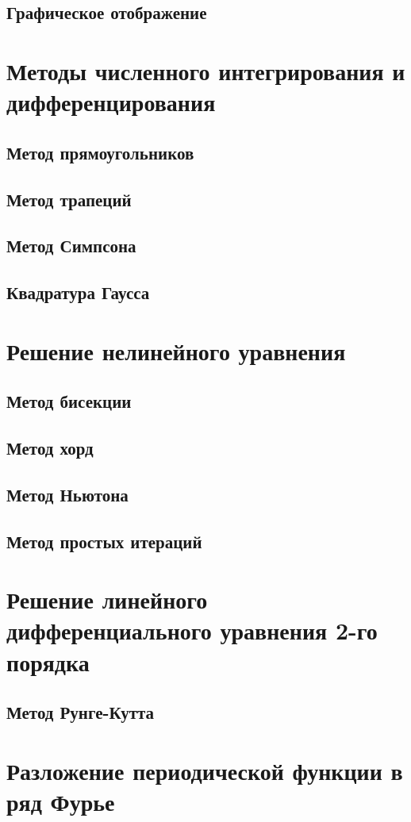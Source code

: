 \documentclass{article}
\begin{document}
\subsection{Графическое отображение}

\section{Методы численного интегрирования и дифференцирования}
\subsection{Метод прямоугольников}
\subsection{Метод трапеций}
\subsection{Метод Симпсона}
\subsection{Квадратура Гаусса}

\section{Решение нелинейного уравнения}
\subsection{}
\subsection{Метод бисекции}
\subsection{Метод хорд}
\subsection{Метод Ньютона}
\subsection{Метод простых итераций}

\section{Решение линейного дифференциального уравнения 2-го порядка}
\subsection{Метод Рунге-Кутта}

\section{Разложение периодической функции в ряд Фурье}
\end{document}
